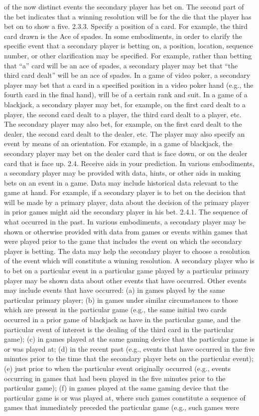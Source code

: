 \documentclass[11pt,a4paper]{article}
\begin{document}
of the now distinct events the secondary player has bet on. The second part of the bet indicates that a winning resolution will be for the die that the player has bet on to show a five. 2.3.3. Specify a position of a card. For example, the third card drawn is the Ace of spades. In some embodiments, in order to clarify the specific event that a secondary player is betting on, a position, location, sequence number, or other clarification may be specified. For example, rather than betting that “a” card will be an ace of spades, a secondary player may bet that “the third card dealt” will be an ace of spades. In a game of video poker, a secondary player may bet that a card in a specified position in a video poker hand (e.g., the fourth card in the final hand), will be of a certain rank and suit. In a game of a blackjack, a secondary player may bet, for example, on the first card dealt to a player, the second card dealt to a player, the third card dealt to a player, etc. The secondary player may also bet, for example, on the first card dealt to the dealer, the second card dealt to the dealer, etc. The player may also specify an event by means of an orientation. For example, in a game of blackjack, the secondary player may bet on the dealer card that is face down, or on the dealer card that is face up. 2.4. Receive aids in your prediction. In various embodiments, a secondary player may be provided with data, hints, or other aids in making bets on an event in a game. Data may include historical data relevant to the game at hand. For example, if a secondary player is to bet on the decision that will be made by a primary player, data about the decision of the primary player in prior games might aid the secondary player in his bet. 2.4.1. The sequence of what occurred in the past. In various embodiments, a secondary player may be shown or otherwise provided with data from games or events within games that were played prior to the game that includes the event on which the secondary player is betting. The data may help the secondary player to choose a resolution of the event which will constitute a winning resolution. A secondary player who is to bet on a particular event in a particular game played by a particular primary player may be shown data about other events that have occurred. Other events may include events that have occurred: (a) in games played by the same particular primary player; (b) in games under similar circumstances to those which are present in the particular game (e.g., the same initial two cards occurred in a prior game of blackjack as have in the particular game, and the particular event of interest is the dealing of the third card in the particular game); (c) in games played at the same gaming device that the particular game is or was played at; (d) in the recent past (e.g., events that have occurred in the five minutes prior to the time that the secondary player bets on the particular event); (e) just prior to when the particular event originally occurred (e.g., events occurring in games that had been played in the five minutes prior to the particular game); (f) in games played at the same gaming device that the particular game is or was played at, where such games constitute a sequence of games that immediately preceded the particular game (e.g., such games were 
\end{document}
